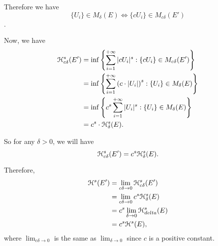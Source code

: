 Therefore we  have \[\{U_i\} \in M_{\delta}(E) \iff \{c U_i\}\in M_{c\delta}(E')\].

Now, we have
\begin{align*}
    \mathcal{H}_{c\delta}^s (E') &= \inf \left\{\sum_{i = 1}^{+\infty} |c  U_i|^s : \{c U_i\} \in M_{c\delta} (E')\right\}\\
    &= \inf \left\{\sum_{i = 1}^{+\infty} \left(c \cdot |U_i|\right)^s : \{U_i\} \in M_{\delta} (E)\right\}\\
    &= \inf \left\{c^s \sum_{i = 1}^{+\infty} |U_i|^s : \{ U_i\} \in M_{\delta} (E)\right\}\\
    &= c^s \cdot \mathcal{H}_{\delta}^s (E).
\end{align*}

So for any \(\delta > 0\), we will have
\[
\mathcal{H}_{c\delta}^s(E') = c^s \mathcal{H}_{\delta}^s(E).
\]

Therefore,
\begin{align*}
    \mathcal{H}^s(E') &= \lim_{c\delta \to 0} \mathcal{H}_{c\delta}^s(E')\\
    &= \lim_{c\delta \to 0} c^s \mathcal{H}_{\delta}^s(E)\\
    &= c^s \lim_{\delta \to 0} \mathcal{H}_{delta}^s(E)\\
    &= c^s \mathcal{H}^s(E),
\end{align*}
where \(\lim_{c\delta \to 0}\) is the same as \(\lim_{\delta \to 0}\) since \(c\) is a positive constant.